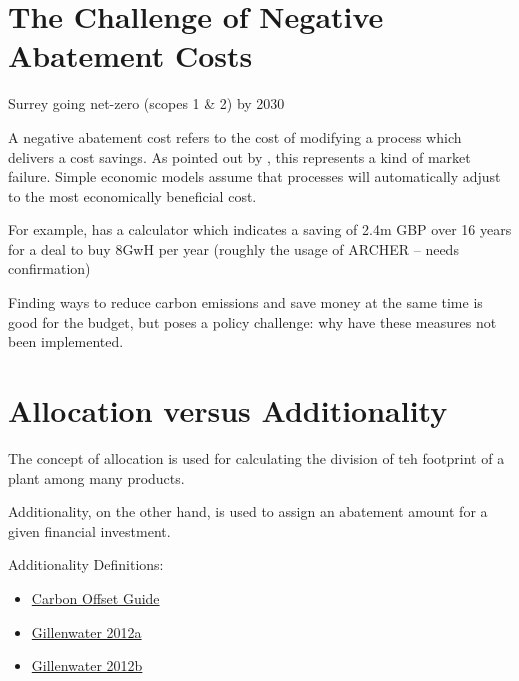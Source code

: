 \documentclass[11pt]{article}
\begin{document}
\section{The Challenge of Negative Abatement Costs}

Surrey going net-zero (scopes 1 \& 2) by 2030\cite{oflynn2021}

A negative abatement cost refers to the cost of modifying a process which delivers a cost savings. As pointed out by \cite{elkins2011}, this represents a kind of market failure. Simple economic models assume that processes will automatically adjust to the most economically beneficial cost. 

For example, \cite{ukse-site} has a calculator which indicates a saving of 2.4m GBP over 16 years for a deal to buy 8GwH per year (roughly the usage of ARCHER -- needs confirmation)

Finding ways to reduce carbon emissions and save money at the same time is good for the budget, but poses a policy challenge: why have these measures not been implemented.

\section{Allocation versus Additionality}

The concept of allocation is used for calculating the division of teh footprint of a plant among many products.

Additionality, on the other hand, is used to assign an abatement amount for a given financial investment.

Additionality Definitions: 
\begin{itemize}
   \item \href{https://www.offsetguide.org/high-quality-offsets/additionality/}{Carbon Offset Guide}
   \item \href{https://ghginstitute.org/wp-content/uploads/2015/04/AdditionalityPaper_Part-1ver3FINAL.pdf}{Gillenwater 2012a}
   \item \href{https://www.researchgate.net/publication/257945160_What_Is_Additionality_Part_2_A_framework_for_a_more_precise_definition_and_standardized_approaches}{Gillenwater 2012b}
\end{itemize}

\printbibliography
\end{document}
